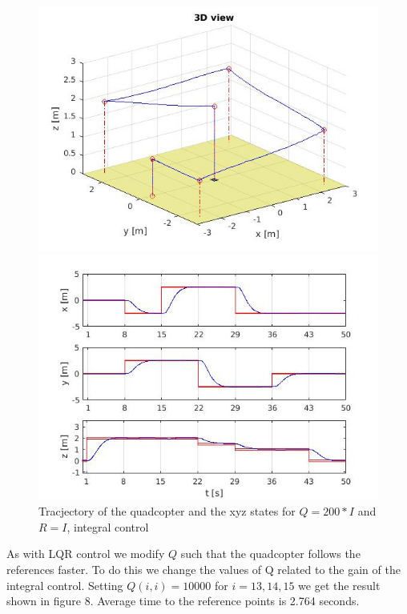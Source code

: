 \documentclass[]{article}
\begin{document}
\begin{figure}[H]
\begin{minipage}{.5\textwidth}
\includegraphics[width=\textwidth]{trajectoryi2.jpg}
\end{minipage}%
\begin{minipage}{.5\textwidth}
\includegraphics[width=\textwidth]{xyzi2.jpg}
\end{minipage}
\caption{Tracjectory of the quadcopter and the xyz states for $Q = 200*I$ and $R = I$, integral control}
\end{figure}

As with LQR control we modify $Q$ such that the quadcopter follows the references faster. To do this we change the values of Q related to the gain of the integral control. Setting $Q(i,i) = 10000$ for $i=13,14,15$ we get the result shown in figure 8. Average time to the reference points is 2.764 seconds.
\end{document}
